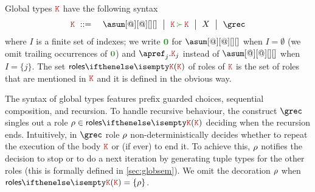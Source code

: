 Global types $\aK$ have the following syntax
\begin{eqnarray*}
  \aK & \bnfdef & \asum[@][@][][]
                  \bnfmid
                  \aK \seqop \aK \bnfmid
                  X \bnfmid
                  \grec
\end{eqnarray*}
where $I$ is a finite set of indexes; we write $\nil$ for
$\asum[@][@][][]$ when $I = \emptyset$ (we omit trailing occurrences
of $\nil$) and $\apref_j.\aK_j$ instead of $\asum[@][@][][]$ when
$I = \{j\}$.
%
The set $\roles \aK$ of roles of $\aK$ is the set of roles that are mentioned in $\aK$ and it is defined in the obvious way.

The syntax of global types features prefix guarded choices, sequential
composition, and recursion.
%
To handle recursive behaviour, 
the construct $\grec$ singles out a role $\arole \in \roles \aK$
%
deciding when the recursion ends.
%
Intuitively, in $\grec$ role  $\rho$ non-deterministically decides whether 
to repeat the execution of  the body $\aK$  or (if ever) to end it.
%
To achieve this,  $\rho$ notifies the decision to stop or to do a next iteration by generating tuple types for the
other roles (this is formally defined in \cref{sec:globsem}).
%
We omit the decoration $\rho$ when $\roles \aK = \{\arole\}$.

